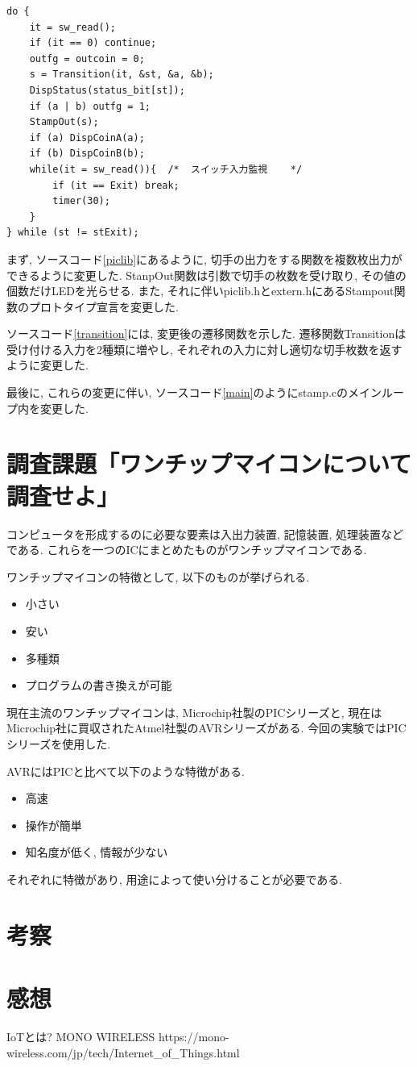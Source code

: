 \documentclass[titlepage]{jsarticle}
\begin{document}
        \begin{lstlisting}[caption=stamp.c メインループ, label=main]
do {
    it = sw_read();
    if (it == 0) continue;
    outfg = outcoin = 0;
    s = Transition(it, &st, &a, &b);
    DispStatus(status_bit[st]);
    if (a | b) outfg = 1;
    StampOut(s);
    if (a) DispCoinA(a);
    if (b) DispCoinB(b);
    while(it = sw_read()){	/*  スイッチ入力監視	*/
        if (it == Exit) break;
        timer(30);
    }
} while (st != stExit);
        \end{lstlisting}

        まず, ソースコード\ref{piclib}にあるように, 切手の出力をする関数を複数枚出力ができるように変更した.
        StanpOut関数は引数で切手の枚数を受け取り, その値の個数だけLEDを光らせる.
        また, それに伴いpiclib.hとextern.hにあるStampout関数のプロトタイプ宣言を変更した.

        ソースコード\ref{transition}には, 変更後の遷移関数を示した.
        遷移関数Transitionは受け付ける入力を2種類に増やし,
        それぞれの入力に対し適切な切手枚数を返すように変更した.

        最後に, これらの変更に伴い, ソースコード\ref{main}のようにstamp.cのメインループ内を変更した.
    
\section{調査課題「ワンチップマイコンについて調査せよ」}
    コンピュータを形成するのに必要な要素は入出力装置, 記憶装置, 処理装置などである.
    これらを一つのICにまとめたものがワンチップマイコンである.

    ワンチップマイコンの特徴として, 以下のものが挙げられる.

    \begin{itemize}
        \item 小さい
        \item 安い
        \item 多種類
        \item プログラムの書き換えが可能
    \end{itemize}

    現在主流のワンチップマイコンは, Microchip社製のPICシリーズと,
    現在はMicrochip社に買収されたAtmel社製のAVRシリーズがある.
    今回の実験ではPICシリーズを使用した.

    AVRにはPICと比べて以下のような特徴がある.

    \begin{itemize}
        \item 高速
        \item 操作が簡単
        \item 知名度が低く, 情報が少ない
    \end{itemize}

    それぞれに特徴があり, 用途によって使い分けることが必要である.

\section{考察}
    

\section{感想}


\begin{thebibliography}{99}
     IoTとは? MONO WIRELESS https://mono-wireless.com/jp/tech/Internet\_of\_Things.html
\end{thebibliography}
\end{document}
